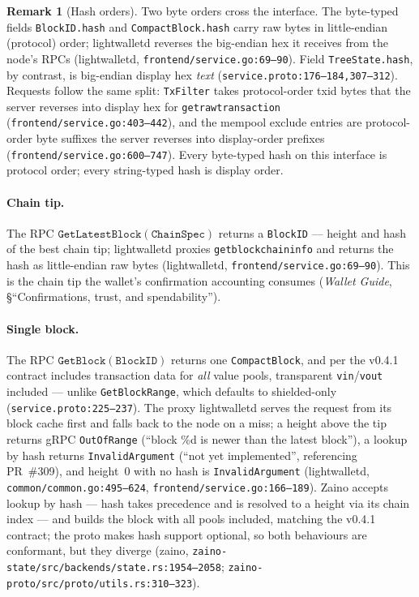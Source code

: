 \documentclass[11pt,a4paper]{article}
\theoremstyle{definition}
\newtheorem{remark}[theorem]{Remark}
\begin{document}
\begin{remark}[Hash orders]\label{rem:sync-endian}
Two byte orders cross the interface. The byte-typed fields
\texttt{BlockID.hash} and \texttt{CompactBlock.hash} carry raw bytes in
little-endian (protocol) order; lightwalletd reverses the
big-endian hex it receives from the node's RPCs
(\textsf{lightwalletd}, \texttt{frontend/service.go:69--90}). Field
\texttt{TreeState.hash}, by contrast, is big-endian display hex
\emph{text} (\texttt{service.proto:176--184,307--312}). Requests follow
the same split: \texttt{TxFilter} takes protocol-order txid bytes that
the server reverses into display hex for \texttt{getrawtransaction}
(\texttt{frontend/service.go:403--442}), and the mempool exclude entries
are protocol-order byte suffixes the server reverses into display-order
prefixes (\texttt{frontend/service.go:600--747}). Every byte-typed hash
on this interface is protocol order; every string-typed hash is display
order.
\end{remark}

\paragraph{Chain tip.} The RPC
$\mathtt{GetLatestBlock}(\mathtt{ChainSpec})$ returns a \texttt{BlockID}
--- height and hash of the best chain tip; lightwalletd proxies
\texttt{getblockchaininfo} and returns the hash as little-endian raw bytes
(\textsf{lightwalletd}, \texttt{frontend/service.go:69--90}). This is the
chain tip the wallet's confirmation accounting consumes (\emph{Wallet
Guide}, \S``Confirmations, trust, and spendability'').

\paragraph{Single block.} The RPC $\mathtt{GetBlock}(\mathtt{BlockID})$
returns one \texttt{CompactBlock}, and per the v0.4.1 contract includes
transaction data for \emph{all} value pools, transparent
\texttt{vin}/\texttt{vout} included --- unlike \texttt{GetBlockRange},
which defaults to shielded-only (\texttt{service.proto:225--237}).
The proxy lightwalletd serves the request from its block cache first and
falls back to the node on a miss; a height above the tip returns gRPC
\texttt{OutOfRange} (``block \%d is newer than the latest block''), a
lookup by hash returns \texttt{InvalidArgument} (``not yet implemented'',
referencing PR~\#309), and height~0 with no hash is
\texttt{InvalidArgument} (\textsf{lightwalletd},
\texttt{common/common.go:495--624}, \texttt{frontend/service.go:166--189}).
Zaino accepts lookup by hash --- hash takes precedence and is resolved to
a height via its chain index --- and builds the block with all pools
included, matching the v0.4.1 contract; the proto makes hash support
optional, so both behaviours are conformant, but they diverge
(\textsf{zaino}, \texttt{zaino-state/src/backends/state.rs:1954--2058};
\texttt{zaino-proto/src/proto/utils.rs:310--323}).
\end{document}
